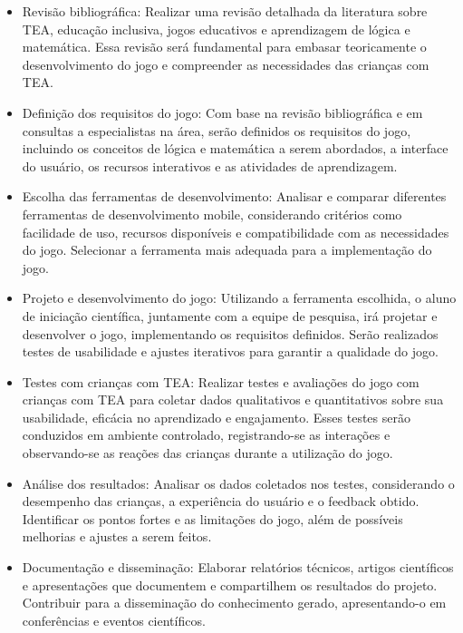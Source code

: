 \documentclass[tcc1,project]{classe_uftex/uftex}
\begin{document}
\begin{itemize}
    \item Revisão bibliográfica: Realizar uma revisão detalhada da literatura sobre TEA, educação inclusiva, jogos educativos e aprendizagem de lógica e matemática. Essa revisão será fundamental para embasar teoricamente o desenvolvimento do jogo e compreender as necessidades das crianças com TEA.

    \item Definição dos requisitos do jogo: Com base na revisão bibliográfica e em consultas a especialistas na área, serão definidos os requisitos do jogo, incluindo os conceitos de lógica e matemática a serem abordados, a interface do usuário, os recursos interativos e as atividades de aprendizagem.

    \item Escolha das ferramentas de desenvolvimento: Analisar e comparar diferentes ferramentas de desenvolvimento mobile, considerando critérios como facilidade de uso, recursos disponíveis e compatibilidade com as necessidades do jogo. Selecionar a ferramenta mais adequada para a implementação do jogo.

    \item Projeto e desenvolvimento do jogo: Utilizando a ferramenta escolhida, o aluno de iniciação científica, juntamente com a equipe de pesquisa, irá projetar e desenvolver o jogo, implementando os requisitos definidos. Serão realizados testes de usabilidade e ajustes iterativos para garantir a qualidade do jogo.


    \item Testes com crianças com TEA: Realizar testes e avaliações do jogo com crianças com TEA para coletar dados qualitativos e quantitativos sobre sua usabilidade, eficácia no aprendizado e engajamento. Esses testes serão conduzidos em ambiente controlado, registrando-se as interações e observando-se as reações das crianças durante a utilização do jogo.

    \item Análise dos resultados: Analisar os dados coletados nos testes, considerando o desempenho das crianças, a experiência do usuário e o feedback obtido. Identificar os pontos fortes e as limitações do jogo, além de possíveis melhorias e ajustes a serem feitos.

    \item Documentação e disseminação: Elaborar relatórios técnicos, artigos científicos e apresentações que documentem e compartilhem os resultados do projeto. Contribuir para a disseminação do conhecimento gerado, apresentando-o em conferências e eventos científicos.

\end{itemize}
\end{document}
